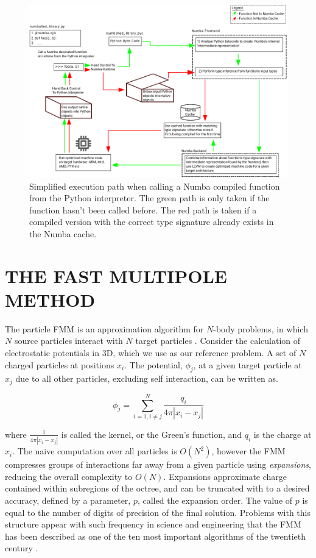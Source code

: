 \documentclass{IEEEcsmag}
\begin{document}
\begin{figure}
    \centerline{\includegraphics {figures/numba.pdf}}
    \caption{Simplified execution path when calling a Numba compiled function from the Python interpreter. The green path is only taken if the function hasn't been called before. The red path is taken if a compiled version with the correct type signature already exists in the Numba cache.}
    \label{fig:numba}
\end{figure}



\section{THE FAST MULTIPOLE METHOD}

The particle FMM is an approximation algorithm for $N$-body problems, in which $N$ source particles interact with $N$ target particles \cite{Greengard1987}. Consider the calculation of electrostatic potentials in 3D, which we use as our reference problem. A set of $N$ charged particles at positions $x_i$. The potential, $\phi_j$, at a given target particle at $x_j$ due to all other particles, excluding self interaction, can be written as.

\begin{equation}
    \phi_j = \sum_{i=1, i \neq j}^{N} \frac{q_i}{4 \pi| x_i-x_j |}
    \label{eq:laplace_kernel}
\end{equation}

where $\frac{1}{4 \pi| x_i-x_j|}$ is called the kernel, or the Green's function, and $q_i$ is the charge at $x_i$. The naive computation over all particles is $O(N^2)$, however the FMM compresses groups of interactions far away from a given particle using \textit{expansions}, reducing the overall complexity to $O(N)$. Expansions approximate charge contained within subregions of the octree, and can be truncated with to a desired accuracy, defined by a parameter, $p$, called the expansion order. The value of $p$ is equal to the number of digits of precision of the final solution. Problems with this structure appear with such frequency in science and engineering that the FMM has been described as one of the ten most important algorithms of the twentieth century \cite{Cipra2000}.
\end{document}
